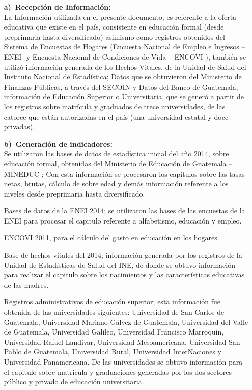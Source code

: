 
\appendix






\begin{itemize}
	
	
	\item[\large\textbf{a)}$\ $]	\textbf{\large Recepción de Información:} \\[-3mm]
	
		 La Información utilizada en el presente documento, es referente a la oferta educativa que existe en el país, consistente en educación formal (desde preprimaria hasta diversificado) asimismo como registros obtenidos del Sistema de Encuestas de Hogares (Encuesta Nacional de Empleo e Ingresos – ENEI- y Encuesta Nacional de Condiciones de Vida – ENCOVI-), también se utilizó información generada de los Hechos Vitales, de la Unidad de Salud del Instituto Nacional de Estadística; Datos que se obtuvieron del Ministerio de Finanzas Públicas, a través del SECOIN y Datos del Banco de Guatemala; información de Educación Superior o Universitaria, que se generó a partir de los registros sobre matrícula y graduados de trece universidades, de las catorce que están autorizadas en el país (una universidad estatal y doce privadas).

	\item[\large\textbf{b)}$\ $]	\textbf{\large Generación de indicadores:} \\[-3mm]
	
		 Se utilizaron las bases de datos de estadística inicial del año 2014, sobre educación formal, obtenidas del Ministerio de Educación de Guatemala – MINEDUC-; Con esta información se procesaron los capítulos sobre las tasas netas, brutas, cálculo de sobre edad y demás información referente a los niveles desde preprimaria hasta diversificado.  
		 
		 Bases de datos de la ENEI 2014; se utilizaron las bases de las encuestas de la ENEI para procesar el capitulo referente a alfabetismo,  educación y empleo. 
		
		   ENCOVI 2011, para el cálculo del gasto en educación en los hogares.
		
		 Base de hechos vitales del 2014; información generada por los registros de la Unidad de Estadísticas de Salud del INE, de donde se obtuvo información para realizar el capitulo sobre los nacimientos y las características educativas de las madres.
		
		 Registros administrativos de educación superior; esta información fue obtenida de las universidades siguientes: Universidad de San Carlos de Guatemala, Universidad Mariano Gálvez de Guatemala, Universidad del Valle de Guatemala, Universidad Galileo, Universidad Francisco Marroquín, Universidad Rafael Landivar, Universidad Mesoamericana, Universidad San Pablo de Guatemala, Universidad Rural, Universidad InterNaciones y Universidad Panamericana. De las universidades se obtuvo información para el capitulo sobre matricula y graduaciones generadas por los dos sectores público y privado de educación universitaria.
		

\end{itemize}
